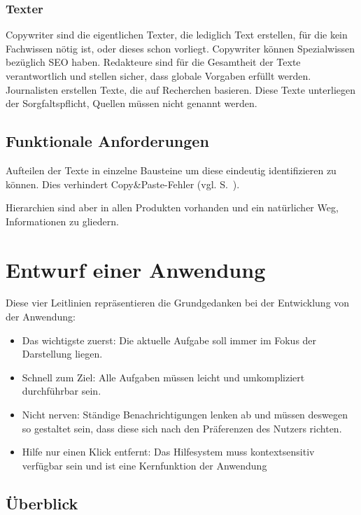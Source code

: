 \subsubsection{Texter}

Copywriter sind die eigentlichen Texter, die lediglich Text erstellen, für die kein Fachwissen nötig ist, oder dieses schon vorliegt. Copywriter können Spezialwissen bezüglich SEO haben. Redakteure sind für die Gesamtheit der Texte verantwortlich und stellen sicher, dass globale Vorgaben erfüllt werden. Journalisten erstellen Texte, die auf Recherchen basieren. Diese Texte unterliegen der Sorgfaltspflicht, Quellen müssen nicht genannt werden. 

\subsection{Funktionale Anforderungen}

\TODO

Aufteilen der Texte in einzelne Bausteine um diese eindeutig identifizieren zu können. Dies verhindert Copy\&Paste-Fehler (vgl. S.~\pageref{p:serielles-konzept}).

\label{l:hierarchien} Hierarchien sind aber in allen Produkten vorhanden und ein natürlicher Weg, Informationen zu gliedern. 

\section{Entwurf einer Anwendung}

Diese vier Leitlinien repräsentieren die Grundgedanken bei der Entwicklung von der Anwendung:

\begin{itemize}
\item{Das wichtigste zuerst: Die aktuelle Aufgabe soll immer im Fokus der Darstellung liegen.}
\item{Schnell zum Ziel: Alle Aufgaben müssen leicht und umkompliziert durchführbar sein.}
\item{Nicht nerven: Ständige Benachrichtigungen lenken ab und müssen deswegen so gestaltet sein, dass diese sich nach den Präferenzen des Nutzers richten.}
\item{Hilfe nur einen Klick entfernt: Das Hilfesystem muss kontextsensitiv verfügbar sein und ist eine Kernfunktion der Anwendung}
\end{itemize}

\subsection{Überblick}

